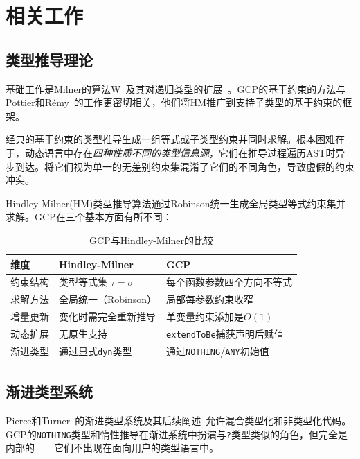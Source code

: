 \documentclass[UTF8]{article}
\begin{document}
\section{相关工作}
\label{sec:related}

\subsection{类型推导理论}

基础工作是Milner的算法W~\cite{milner1978}及其对递归类型的扩展~\cite{damas1982}。GCP的基于约束的方法与Pottier和Rémy~\cite{pottier2005}的工作更密切相关，他们将HM推广到支持子类型的基于约束的框架。

经典的基于约束的类型推导生成一组等式或子类型约束并同时求解。根本困难在于，动态语言中存在\emph{四种性质不同的类型信息源}，它们在推导过程遍历AST时异步到达。将它们视为单一的无差别约束集混淆了它们的不同角色，导致虚假的约束冲突。

Hindley-Milner(HM)类型推导算法通过Robinson统一生成全局类型等式约束集并求解。GCP在三个基本方面有所不同：

\begin{table}[h]
\centering
\caption{GCP与Hindley-Milner的比较}
\label{tab:hm-vs-gcp}
\begin{tabular}{lll}
\toprule
\textbf{维度} & \textbf{Hindley-Milner} & \textbf{GCP} \\
\midrule
约束结构 & 类型等式集 $\tau = \sigma$ & 每个函数参数四个方向不等式 \\
求解方法 & 全局统一（Robinson） & 局部每参数约束收窄 \\
增量更新 & 变化时需完全重新推导 & 单变量约束添加是$O(1)$ \\
动态扩展 & 无原生支持 & \texttt{extendToBe}捕获声明后赋值 \\
渐进类型 & 通过显式\texttt{dyn}类型 & 通过\texttt{NOTHING}/\texttt{ANY}初始值 \\
\bottomrule
\end{tabular}
\end{table}

\subsection{渐进类型系统}

Pierce和Turner~\cite{pierce2000}的渐进类型系统及其后续阐述~\cite{siek2006}允许混合类型化和非类型化代码。GCP的\texttt{NOTHING}类型和惰性推导在渐进系统中扮演与\texttt{?}类型类似的角色，但完全是内部的——它们不出现在面向用户的类型语言中。
\end{document}
